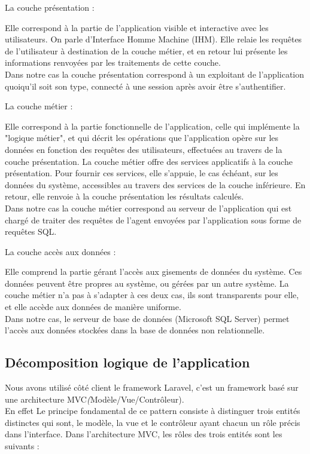 \begin{itemize}
{\bf \item La couche présentation :} Elle correspond à la partie de l’application visible et interactive
avec les utilisateurs. On parle d’Interface Homme Machine (IHM). Elle relaie les requêtes
de l’utilisateur à destination de la couche métier, et en retour lui présente les informations
renvoyées par les traitements de cette couche.\\
Dans notre cas la couche présentation correspond à un exploitant de l'application quoiqu'il soit son type, connecté à une session après avoir être s'authentifier. 
{\bf \item La couche métier : }Elle correspond à la partie fonctionnelle de l’application, celle qui implémente
la "logique métier", et qui décrit les opérations que l’application opère sur les
données en fonction des requêtes des utilisateurs, effectuées au travers de la couche présentation.
La couche métier offre des services applicatifs à la couche présentation. Pour
fournir ces services, elle s’appuie, le cas échéant, sur les données du système, accessibles
au travers des services de la couche inférieure. En retour, elle renvoie à la couche présentation
les résultats calculés.\\
Dans notre cas la couche métier correspond au serveur de l'application  qui est chargé de traiter des
requêtes de l'agent envoyées par l’application sous forme de requêtes SQL. 
{\bf \item  La couche accès aux données :} Elle comprend la partie gérant l’accès aux gisements de
données du système. Ces données peuvent être propres au système, ou gérées par un
autre système. La couche métier n’a pas à s’adapter à ces deux cas, ils sont transparents
pour elle, et elle accède aux données de manière uniforme.\\ Dans notre cas, le serveur de base de données (Microsoft SQL Server) permet l'accès aux données stockées dans la base de données non relationnelle.
\end{itemize}
\subsection{Décomposition logique de l’application}
Nous avons utilisé côté client le framework Laravel, c’est un framework basé sur une
architecture MVC\emph ({Modèle/Vue/Contrôleur})\cite{cite3}.\\
En effet Le principe fondamental de ce pattern consiste à distinguer trois entités distinctes qui sont, le modèle, la vue et le contrôleur ayant chacun un rôle précis dans l'interface. 
Dans l'architecture MVC, les rôles des trois entités sont les suivants :

